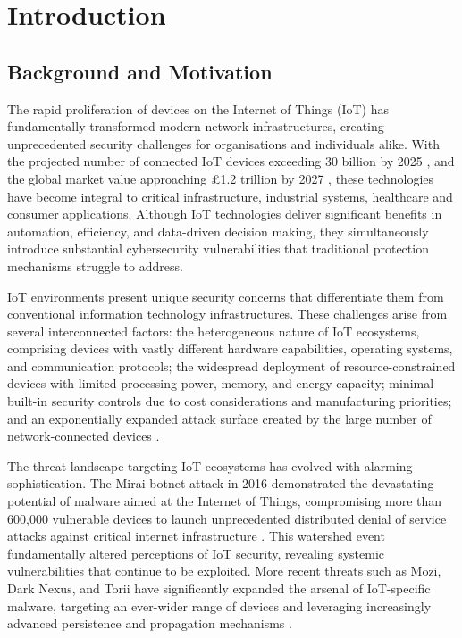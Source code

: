 \chapter{Introduction}

\section{Background and Motivation}

The rapid proliferation of devices on the Internet of Things (IoT) has fundamentally transformed modern network infrastructures, creating unprecedented security challenges for organisations and individuals alike. With the projected number of connected IoT devices exceeding 30 billion by 2025 \citep{Cisco2020}, and the global market value approaching £1.2 trillion by 2027 \citep{IoTAnalytics2021}, these technologies have become integral to critical infrastructure, industrial systems, healthcare and consumer applications. Although IoT technologies deliver significant benefits in automation, efficiency, and data-driven decision making, they simultaneously introduce substantial cybersecurity vulnerabilities that traditional protection mechanisms struggle to address.

IoT environments present unique security concerns that differentiate them from conventional information technology infrastructures. These challenges arise from several interconnected factors: the heterogeneous nature of IoT ecosystems, comprising devices with vastly different hardware capabilities, operating systems, and communication protocols; the widespread deployment of resource-constrained devices with limited processing power, memory, and energy capacity; minimal built-in security controls due to cost considerations and manufacturing priorities; and an exponentially expanded attack surface created by the large number of network-connected devices \citep{Bertino2017, Neshenko2019}.

The threat landscape targeting IoT ecosystems has evolved with alarming sophistication. The Mirai botnet attack in 2016 demonstrated the devastating potential of malware aimed at the Internet of Things, compromising more than 600,000 vulnerable devices to launch unprecedented distributed denial of service attacks against critical internet infrastructure \citep{Antonakakis2017}. This watershed event fundamentally altered perceptions of IoT security, revealing systemic vulnerabilities that continue to be exploited. More recent threats such as Mozi, Dark Nexus, and Torii have significantly expanded the arsenal of IoT-specific malware, targeting an ever-wider range of devices and leveraging increasingly advanced persistence and propagation mechanisms \citep{Kambourakis2021, Mehrban2021}.

